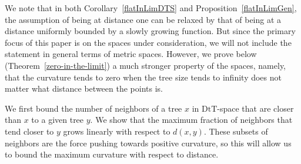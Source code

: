 \documentclass{amsart}
\newcommand{\dts}{\mathrm{DtT}}
\begin{document}
We note that in both Corollary~\ref{flatInLimDTS} and Proposition~\ref{flatInLimGen}, the assumption of being at distance one can be relaxed by that of being at a distance uniformly bounded by a slowly growing function.
But since the primary focus of this paper is on the spaces under consideration, we will not  include the statement in general terms of metric spaces. 
However, we prove below (Theorem~\ref{zero-in-the-limit}) a much stronger property of the spaces, namely, that the curvature tends to zero when the tree size tends to infinity does not matter what distance between the points is.

We first bound the number of neighbors of a tree $x$ in $\dts$-space that are closer than $x$ to a given tree $y$.
We show that the maximum fraction of neighbors that tend closer to $y$ grows linearly with respect to $d(x,y)$.
These subsets of neighbors are the force pushing towards positive curvature, so this will allow us to bound the maximum curvature with respect to distance.
\end{document}
